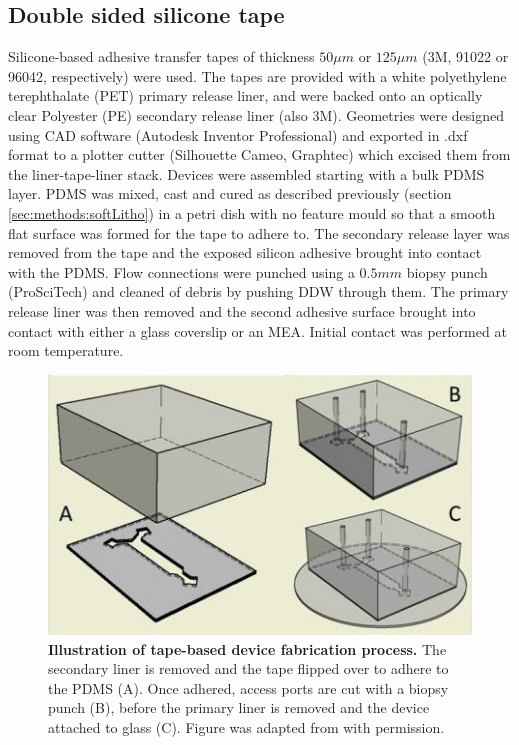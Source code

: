         \subsection{Double sided silicone tape}
        Silicone-based adhesive transfer tapes of thickness \(50\mu m\) or \(125\mu m\) (3M, 91022 or 96042, respectively) were used. The tapes are provided with a white polyethylene terephthalate (PET) primary release liner, and were backed onto an optically clear Polyester (PE) secondary release liner (also 3M). Geometries were designed using CAD software (Autodesk Inventor Professional) and exported in .dxf format to a plotter cutter (Silhouette Cameo, Graphtec) which excised them from the liner-tape-liner stack. Devices were assembled starting with a bulk PDMS layer. PDMS was mixed, cast and cured as described previously (section \ref{sec:methods:softLitho}) in a petri dish with no feature mould so that a smooth flat surface was formed for the tape to adhere to. The secondary release layer was removed from the tape and the exposed silicon adhesive brought into contact with the PDMS. Flow connections were punched using a \(0.5mm\) biopsy punch (ProSciTech) and cleaned of debris by pushing DDW through them. The primary release liner was then removed and the second adhesive surface brought into contact with either a glass coverslip or an MEA. Initial contact was performed at room temperature.

        \begin{figure}[h]
            \centering
            \includegraphics[scale=0.7]{chapter2/figures/tapeBonding/tapeBonding.jpg}
            \caption[Illustration of tape-based device fabrication process]{\textbf{Illustration of tape-based device fabrication process.} The secondary liner is removed and the tape flipped over to adhere to the PDMS (A). Once adhered, access ports are cut with a biopsy punch (B), before the primary liner is removed and the device attached to glass (C). Figure was adapted from \cite{johnstoneThesis} with permission.}
            \label{fig:methods:tapeBonding}
        \end{figure}
        \label{sec:methods:tape}

